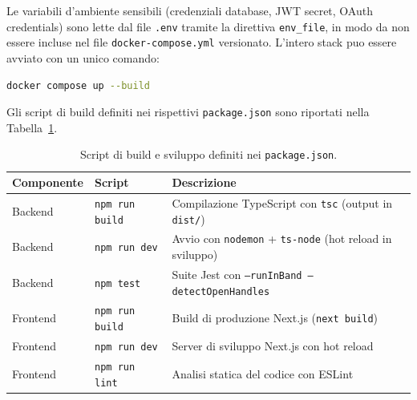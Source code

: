 \documentclass[a4paper,11pt]{article}
\begin{document}
Le variabili d'ambiente sensibili (credenziali database, JWT secret, OAuth credentials) sono lette dal file \texttt{.env} tramite la direttiva \texttt{env\_file}, in modo da non essere incluse nel file \texttt{docker-compose.yml} versionato. L'intero stack puo essere avviato con un unico comando:

\begin{lstlisting}[style=projectcode, language=bash]
docker compose up --build
\end{lstlisting}

Gli script di build definiti nei rispettivi \texttt{package.json} sono riportati nella Tabella~\ref{tab:build-scripts}.

\begin{table}[H]
\centering
\begin{tabularx}{\textwidth}{@{}l l X@{}}
\toprule
Componente & Script & Descrizione \\
\midrule
Backend & \texttt{npm run build} & Compilazione TypeScript con \texttt{tsc} (output in \texttt{dist/}) \\
Backend & \texttt{npm run dev} & Avvio con \texttt{nodemon} + \texttt{ts-node} (hot reload in sviluppo) \\
Backend & \texttt{npm test} & Suite Jest con \texttt{--runInBand --detectOpenHandles} \\
Frontend & \texttt{npm run build} & Build di produzione Next.js (\texttt{next build}) \\
Frontend & \texttt{npm run dev} & Server di sviluppo Next.js con hot reload \\
Frontend & \texttt{npm run lint} & Analisi statica del codice con ESLint \\
\bottomrule
\end{tabularx}
\caption{Script di build e sviluppo definiti nei \texttt{package.json}.}
\label{tab:build-scripts}
\end{table}
\end{document}
